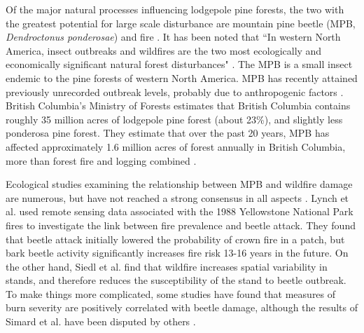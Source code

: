 Of the major natural processes influencing lodgepole pine forests, the two with the greatest potential for large scale disturbance are mountain pine beetle (MPB, \textit{Dendroctonus ponderosae}) and fire \cite{kaufmann2008status}. It has been noted that ``In western North America, insect outbreaks and wildfires are the two most ecologically and economically significant natural forest disturbances" \cite{meigs2016insect}. The MPB is a small insect endemic to the pine forests of western North America. MPB has recently attained previously unrecorded outbreak levels, probably due to anthropogenic factors \cite{bentz2010climate,safranyik2007mountain}.  British Columbia's Ministry of Forests estimates that British Columbia contains roughly 35 million acres of lodgepole pine forest (about 23\%), and slightly less ponderosa pine forest. They estimate that over the past 20 years, MPB has affected approximately 1.6 million acres of forest annually in British Columbia, more than forest fire and logging combined \cite{bc2010state}.

Ecological studies examining the relationship between MPB and wildfire damage are numerous, but have not reached a strong consensus in all aspects \cite{axelson2009influence,lynch2006influence, simard2011mountain, bradley2001effects,kaufmann2008status,meigs2016insect,agne2016fire,seidl2016spatial,JENKINS200816}. Lynch et al. \cite{lynch2006influence} used remote sensing data associated with the 1988 Yellowstone National Park fires to investigate the link between fire prevalence and beetle attack. They found that beetle attack initially lowered the probability of crown fire in a patch, but bark beetle activity significantly increases fire risk 13-16 years in the future. On the other hand, Siedl et al. \cite{seidl2016spatial} find that wildfire increases spatial variability in stands, and therefore reduces the susceptibility of the stand to beetle outbreak. To make things more complicated, some studies have found that measures of burn severity are positively correlated with beetle damage\cite{simard2011mountain, bradley2001effects}, although the results of Simard et al. \cite{simard2011mountain} have been disputed by others \cite{moran2012mountain}.

